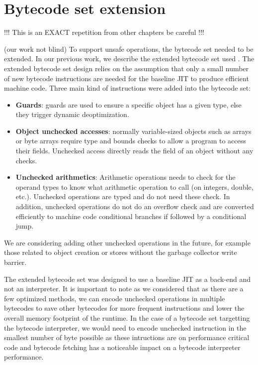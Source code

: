 \documentclass[a4paper,12pt,twoside]{../includes/ThesisStyle}
\begin{document}
\section{Bytecode set extension}

!!!
This is an EXACT repetition from other chapters be careful
!!!

(our work not blind)
To support unsafe operations, the bytecode set needed to be extended. In our previous work, we describe the extended bytecode set used \cite{Bera14a}. The extended bytecode set design relies on the assumption that only a small number of new bytecode instructions are needed for the baseline JIT to produce efficient machine code. Three main kind of instructions were added into the bytecode set:
\begin{itemize}
\item \textbf{Guards}: guards are used to ensure a specific object has a given type, else they trigger dynamic deoptimization.
\item \textbf{Object unchecked accesses}: normally variable-sized objects such as arrays or byte arrays require type and bounds checks to allow a program to access their fields. Unchecked access directly reads the field of an object without any checks.
\item \textbf{Unchecked arithmetics}: Arithmetic operations needs to check for the operand types to know what arithmetic operation to call (on integers, double, etc.). Unchecked operations are typed and do not need these check. In addition, unchecked operations do not do an overflow check and are converted efficiently to machine code conditional branches if followed by a conditional jump.
\end{itemize}

We are considering adding other unchecked operations in the future, for example those related to object creation or stores without the garbage collector write barrier.

The extended bytecode set was designed to use a baseline JIT as a back-end and not an interpreter. It is important to note as we considered that as there are a few optimized methods, we can encode unchecked operations in multiple bytecodes to save other bytecodes for more frequent instructions and lower the overall memory footprint of the runtime. In the case of a bytecode set targetting the bytecode interpreter, we would need to encode unchecked instruction in the smallest number of byte possible as these intructions are on performance critical code and bytecode fetching has a noticeable impact on a bytecode interpreter performance.
\end{document}
